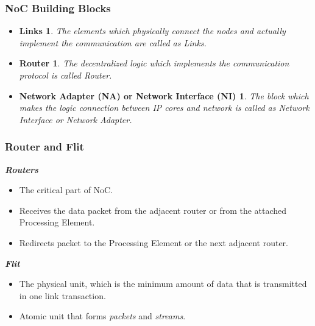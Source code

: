 \begin{frame}
  \frametitle {NoC Building Blocks}
   
 \newtheorem*{link}{Links}
 \newtheorem*{router}{Router}
 \newtheorem*{network_interface}{Network Adapter (NA) or Network Interface (NI)}
    
    \begin {itemize}
      \item \begin{link}
	      The elements which physically connect the nodes and actually
	      implement the communication are called as \textit{Links}.
	    \end{link}
      
      \item \begin {router}
	      The decentralized logic which implements the communication
	      protocol is called \textit{Router}.
	    \end {router}
	    	
	
      \item \begin{network_interface}
	      The block which makes the logic connection between IP cores and network is called as 
	      Network Interface or Network Adapter.
	    \end{network_interface}
    \end {itemize}

\end{frame}


\begin {frame}
     \frametitle {Router and Flit}
      \textbf{\textit{Routers}}
	\begin {itemize}
	  \item The critical part of NoC.
	  \item Receives the data packet from the adjacent router or from the attached Processing Element.
	  \item Redirects packet to the Processing Element or the next adjacent router.
	\end {itemize}

	
     \textbf{\textit{Flit}}
     \begin {itemize}
	  \item The physical unit, which is the minimum amount of data that is transmitted in one link transaction.  
	  \item Atomic unit that forms \textit{packets} and \textit{streams}.
      \end {itemize}
\end {frame}


